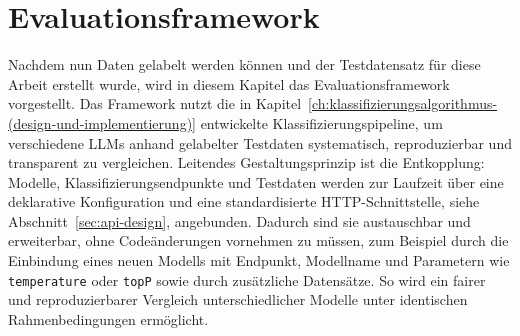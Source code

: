 
\chapter{Evaluationsframework}\label{ch:evaluationsframework}

Nachdem nun Daten gelabelt werden können und der Testdatensatz für diese Arbeit erstellt wurde, wird in diesem Kapitel das Evaluationsframework vorgestellt. Das Framework nutzt die in Kapitel~\ref{ch:klassifizierungsalgorithmus-(design-und-implementierung)} entwickelte Klassifizierungspipeline, um verschiedene \acp{LLM} anhand gelabelter Testdaten systematisch, reproduzierbar und transparent zu vergleichen. Leitendes Gestaltungsprinzip ist die Entkopplung: Modelle, Klassifizierungsendpunkte und Testdaten werden zur Laufzeit über eine deklarative Konfiguration und eine standardisierte HTTP-Schnittstelle, siehe Abschnitt~\ref{sec:api-design}, angebunden. Dadurch sind sie austauschbar und erweiterbar, ohne Codeänderungen vornehmen zu müssen, zum Beispiel durch die Einbindung eines neuen Modells mit Endpunkt, Modellname und Parametern wie \texttt{temperature} oder \texttt{topP} sowie durch zusätzliche Datensätze. So wird ein fairer und reproduzierbarer Vergleich unterschiedlicher Modelle unter identischen Rahmenbedingungen ermöglicht.





